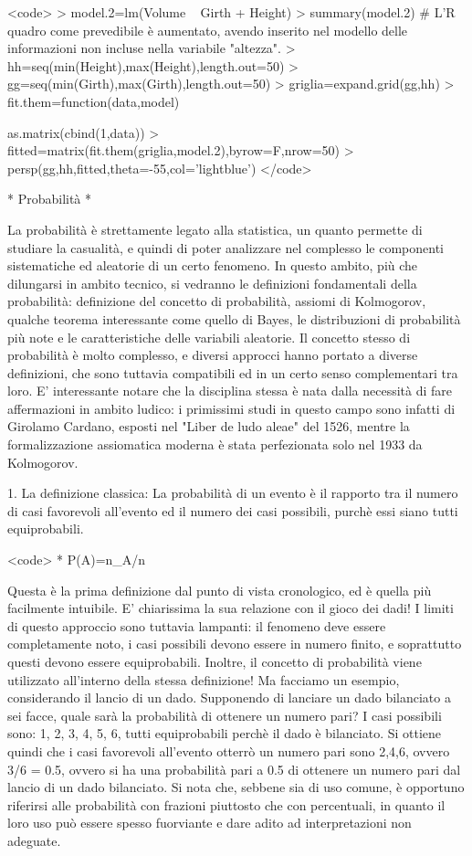 \documentclass{book}
\begin{document}
<code>
> model.2=lm(Volume ~ Girth + Height)
> summary(model.2)
# L'R quadro come prevedibile è aumentato, avendo inserito nel modello delle informazioni non incluse nella variabile "altezza".
> hh=seq(min(Height),max(Height),length.out=50)
> gg=seq(min(Girth),max(Girth),length.out=50)
> griglia=expand.grid(gg,hh)
> fit.them=function(data,model) {as.matrix(cbind(1,data))%
> fitted=matrix(fit.them(griglia,model.2),byrow=F,nrow=50)
> persp(gg,hh,fitted,theta=-55,col='lightblue')
</code>

		* Probabilità *

La probabilità è strettamente legato alla statistica, un quanto permette di studiare la casualità, e quindi di poter analizzare nel complesso le componenti sistematiche ed aleatorie di un certo fenomeno. In questo ambito, più che dilungarsi in ambito tecnico, si vedranno le definizioni fondamentali della probabilità: definizione del concetto di probabilità, assiomi di Kolmogorov, qualche teorema interessante come quello di Bayes, le distribuzioni di probabilità più note e le caratteristiche delle variabili aleatorie.
Il concetto stesso di probabilità è molto complesso, e diversi approcci hanno portato a diverse definizioni, che sono tuttavia compatibili ed in un certo senso complementari tra loro. E' interessante notare che la disciplina stessa è nata dalla necessità di fare affermazioni in ambito ludico: i primissimi studi in questo campo sono infatti di Girolamo Cardano, esposti nel "Liber de ludo aleae" del 1526, mentre la formalizzazione assiomatica moderna è stata perfezionata solo nel 1933 da Kolmogorov.

1. La definizione classica:
La probabilità di un evento è il rapporto tra il numero di casi favorevoli all'evento ed il numero dei casi possibili, purchè essi siano tutti equiprobabili.

<code>
 *	P(A)=n_A/n

Questa è la prima definizione dal punto di vista cronologico, ed è quella più facilmente intuibile. E' chiarissima la sua relazione con il gioco dei dadi!
I limiti di questo approccio sono tuttavia lampanti: il fenomeno deve essere completamente noto, i casi possibili devono essere in numero finito, e soprattutto questi devono essere equiprobabili. Inoltre, il concetto di probabilità viene utilizzato all'interno della stessa definizione!
Ma facciamo un esempio, considerando il lancio di un dado.
Supponendo di lanciare un dado bilanciato a sei facce, quale sarà la probabilità di ottenere un numero pari?
I casi possibili sono: {1, 2, 3, 4, 5, 6}, tutti equiprobabili perchè il dado è bilanciato.
Si ottiene quindi che i casi favorevoli all'evento {otterrò un numero pari} sono {2,4,6}, ovvero 3/6 = 0.5, ovvero si ha una probabilità pari a 0.5 di ottenere un numero pari dal lancio di un dado bilanciato.
Si nota che, sebbene sia di uso comune, è opportuno riferirsi alle probabilità con frazioni piuttosto che con percentuali, in quanto il loro uso può essere spesso fuorviante e dare adito ad interpretazioni non adeguate.

}
\end{document}
